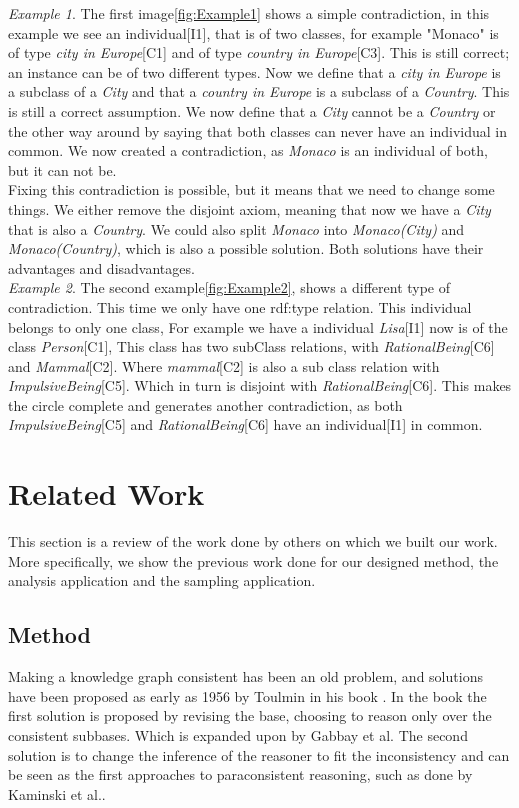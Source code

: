\documentclass[11pt,letterpaper ,oneside ]{book}
\begin{document}
	\textit{Example 1}. The first image\ref{fig:Example1} shows a simple contradiction, in this example we see an individual[I1], that is of two classes, for example "Monaco" is of type \textit{city in Europe}[C1] and of type \textit{country in Europe}[C3]. This is still correct; an instance can be of two different types. Now we define that a \textit{city in Europe} is a subclass of a \textit{City} and that a \textit{country in Europe} is a subclass of a \textit{Country}. This is still a correct assumption. We now define that a \textit{City} cannot be a \textit{Country} or the other way around by saying that both classes can never have an individual in common. We now created a contradiction, as \textit{Monaco} is an individual of both, but it can not be.\\
	
	Fixing this contradiction is possible, but it means that we need to change some things. We either remove the disjoint axiom, meaning that now we have a \textit{City} that is also a \textit{Country}. We could also split \textit{Monaco} into \textit{Monaco(City)} and \textit{Monaco(Country)}, which is also a possible solution. Both solutions have their advantages and disadvantages.\\
	
	\textit{Example 2}. The second example\ref{fig:Example2}, shows a different type of contradiction. This time we only have one rdf:type relation. This individual belongs to only one class, For example we have a individual \textit{Lisa}[I1] now is of the class \textit{Person}[C1], This class has two subClass relations, with \textit{RationalBeing}[C6] and \textit{Mammal}[C2]. Where \textit{mammal}[C2] is also a sub class relation with \textit{ImpulsiveBeing}[C5]. Which in turn is disjoint with \textit{RationalBeing}[C6]. This makes the circle complete and generates another contradiction, as both \textit{ImpulsiveBeing}[C5] and \textit{RationalBeing}[C6] have an individual[I1] in common. \\
	
	
	\chapter{Related Work}\label{RelatedWork}
	This section is a review of the work done by others on which we built our work. More specifically, we show the previous work done for our designed method, the analysis application and the sampling application. 
	
	\section{Method}
	Making a knowledge graph consistent has been an old problem, and solutions have been proposed as early as 1956 by Toulmin in his book \cite{toulmin:1956}. In the book the first solution is proposed by revising the base, choosing to reason only over the consistent subbases. Which is expanded upon by Gabbay et al\cite{Gabbay:1994}. The second solution is to change the inference of the reasoner to fit the inconsistency and can be seen as the first approaches to paraconsistent reasoning, such as done by Kaminski et al.\cite{Kaminski:2015}.
	
\end{document}
